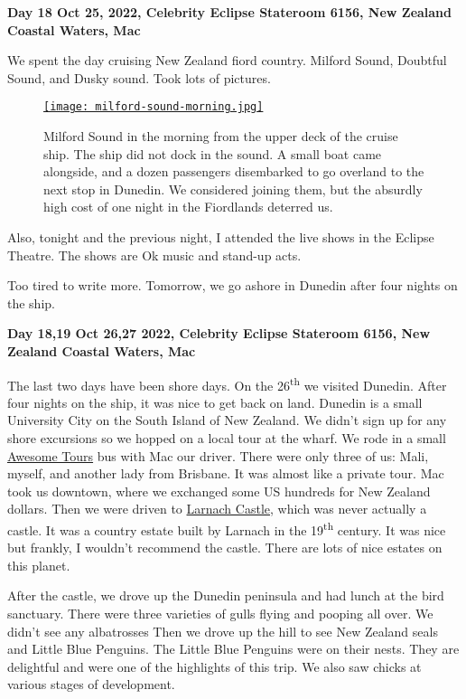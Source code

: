 \textbf{Day 18 Oct 25, 2022, Celebrity Eclipse Stateroom 6156, New Zealand Coastal Waters, Mac}

We spent the day cruising New Zealand fiord country. Milford Sound,
Doubtful Sound, and Dusky sound. Took lots of pictures.

\captionsetup[figure]{labelformat=empty}
\begin{figure}[htbp]
\centering
\href{https://conceptcontrol.smugmug.com/Trips/Overseas/Australia-New-Zealand-2022/i-8Mw2Rdz/A}{\texttt{[image: milford-sound-morning.jpg]}}
\caption[Milford Sound in the morning]{Milford Sound in the morning from the upper deck of the cruise
ship. The ship did not dock in the sound. A small boat came alongside,
and a dozen passengers disembarked to go overland to the next stop in
Dunedin. We considered joining them, but the absurdly high cost of one
night in the Fiordlands deterred us.}
\label{fig:7606x2}
\end{figure}

Also, tonight and the previous night, I attended the live shows in the
Eclipse Theatre. The shows are Ok music and stand-up acts.

Too tired to write more. Tomorrow, we go ashore in Dunedin after four
nights on the ship.

\textbf{Day 18,19 Oct 26,27 2022, Celebrity Eclipse Stateroom 6156, New Zealand Coastal Waters, Mac}

The last two days have been shore days. On the 26\textsuperscript{th} we
visited Dunedin. After four nights on the ship, it was nice to get back
on land. Dunedin is a small University City on the South Island of New
Zealand. We didn't sign up for any shore excursions so we hopped on a
local tour at the wharf. We rode in a small
\href{https://awesometours.co.nz/}{Awesome Tours} bus with Mac our
driver. There were only three of us: Mali, myself, and another lady from
Brisbane. It was almost like a private tour. Mac took us downtown, where
we exchanged some US hundreds for New Zealand dollars. Then we were
driven to \href{https://www.larnachcastle.co.nz/}{Larnach Castle}, which
was never actually a castle. It was a country estate built by Larnach in
the 19\textsuperscript{th} century. It was nice but frankly, I wouldn't
recommend the castle. There are lots of nice estates on this planet.

After the castle, we drove up the Dunedin peninsula and had lunch at the
bird sanctuary. There were three varieties of gulls flying and pooping
all over. We didn't see any albatrosses Then we drove up the hill to see
New Zealand seals and Little Blue Penguins. The Little Blue Penguins
were on their nests. They are delightful and were one of the highlights
of this trip. We also saw chicks at various stages of development.


